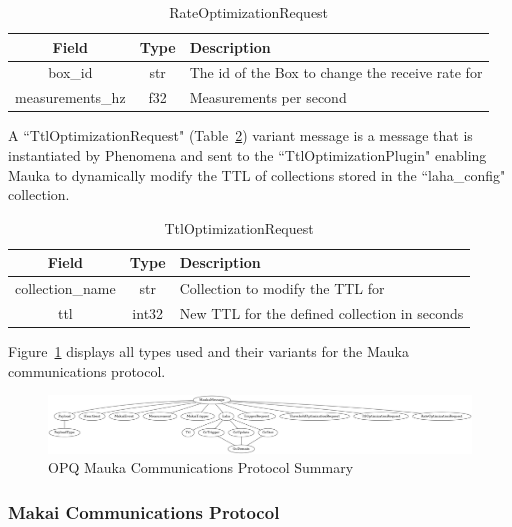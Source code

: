 \begin{table}[H]
	\centering
	\caption{RateOptimizationRequest}
	\begin{tabular}{|c|c|p{8cm}|}
		\hline
		Field & Type & Description  \\
		\hline
		box\_id & str & The id of the Box to change the receive rate for \\
		\hline
		measurements\_hz & f32 & Measurements per second \\
		\hline
	\end{tabular}
	\label{table:RateOptimizationRequest}
\end{table}

A ``TtlOptimizationRequest" (Table~\ref{table:TtlOptimizationRequest}) variant message is a message that is instantiated by Phenomena and sent to the ``TtlOptimizationPlugin" enabling Mauka to dynamically modify the TTL of collections stored in the ``laha\_config" collection.

\begin{table}[H]
	\centering
	\caption{TtlOptimizationRequest}
	\begin{tabular}{|c|c|p{8cm}|}
		\hline
		Field & Type & Description  \\
		\hline
		collection\_name & str & Collection to modify the TTL for \\
		\hline
		ttl & int32 & New TTL for the defined collection in seconds \\
		\hline
	\end{tabular}
	\label{table:TtlOptimizationRequest}
\end{table}

Figure~\ref{fig:mauka_messages} displays all types used and their variants for the Mauka communications protocol.

\begin{figure}
	\centering
	\includegraphics[width=\linewidth]{figures/mauka_messages.png}
	\caption{OPQ Mauka Communications Protocol Summary}
	\label{fig:mauka_messages}
\end{figure}

\subsubsection{Makai Communications Protocol}

